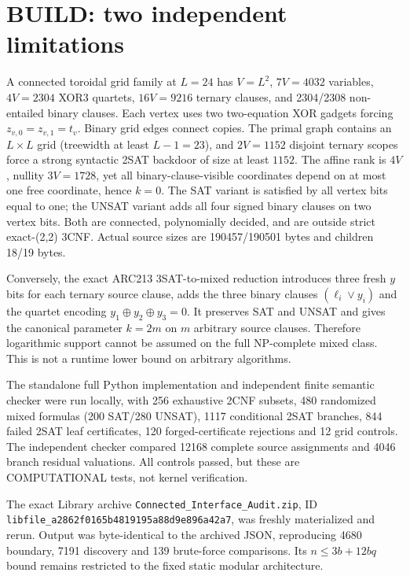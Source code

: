 \documentclass[11pt]{article}
\begin{document}
\section{BUILD: two independent limitations}
A connected toroidal grid family at $L=24$ has $V=L^2$, $7V=4032$ variables, $4V=2304$ XOR3 quartets, $16V=9216$ ternary clauses, and 2304/2308 non-entailed binary clauses. Each vertex uses two two-equation XOR gadgets forcing $z_{v,0}=z_{v,1}=t_v$. Binary grid edges connect copies. The primal graph contains an $L\times L$ grid (treewidth at least $L-1=23$), and $2V=1152$ disjoint ternary scopes force a strong syntactic 2SAT backdoor of size at least $1152$. The affine rank is $4V$, nullity $3V=1728$, yet all binary-clause-visible coordinates depend on at most one free coordinate, hence $k=0$. The SAT variant is satisfied by all vertex bits equal to one; the UNSAT variant adds all four signed binary clauses on two vertex bits. Both are connected, polynomially decided, and are outside strict exact-(2,2) 3CNF. Actual source sizes are 190457/190501 bytes and children 18/19 bytes.

Conversely, the exact ARC213 3SAT-to-mixed reduction introduces three fresh $y$ bits for each ternary source clause, adds the three binary clauses $(\ell_i\vee y_i)$ and the quartet encoding $y_1\oplus y_2\oplus y_3=0$. It preserves SAT and UNSAT and gives the canonical parameter $k=2m$ on $m$ arbitrary source clauses. Therefore logarithmic support cannot be assumed on the full NP-complete mixed class. This is not a runtime lower bound on arbitrary algorithms.

The standalone full Python implementation and independent finite semantic checker were run locally, with 256 exhaustive 2CNF subsets, 480 randomized mixed formulas (200 SAT/280 UNSAT), 1117 conditional 2SAT branches, 844 failed 2SAT leaf certificates, 120 forged-certificate rejections and 12 grid controls. The independent checker compared 12168 complete source assignments and 4046 branch residual valuations. All controls passed, but these are COMPUTATIONAL tests, not kernel verification.

The exact Library archive \texttt{Connected\_Interface\_Audit.zip}, ID \texttt{libfile\_a2862f0165b4819195a88d9e896a42a7}, was freshly materialized and rerun. Output was byte-identical to the archived JSON, reproducing 4680 boundary, 7191 discovery and 139 brute-force comparisons. Its $n\le3b+12bq$ bound remains restricted to the fixed static modular architecture.
\end{document}
